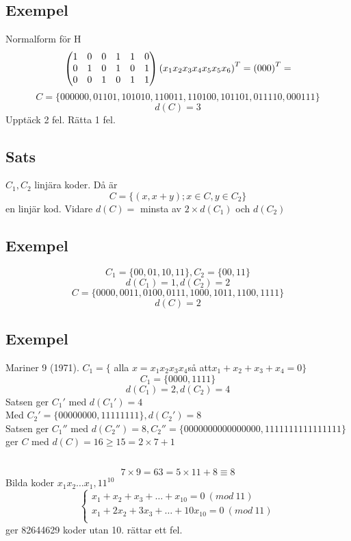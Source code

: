 \documentclass{article}
\begin{document}
\subsection{Exempel}
Normalform för H
$$
\left(\begin{matrix}
1&0&0& 1&1&0\\
0&1&0 &1&0&1\\
0&0&1 &0&1&1
\end{matrix}\right)
\left(
x_1 x_2 x_3 x_4 x_5 x_5 x_6
\right)^T =
\left(
0 0 0
\right)^T =
$$
$$ C=\{ 000000, 01101, 101010, 110011, 110100, 101101, 011110, 000111 \} $$
$$ d(C)=3 $$
Upptäck 2 fel.
Rätta 1 fel.

\subsection{Sats}
$C_1, C_2$ linjära koder.
Då är
$$ C=\{(x,x+y);x\in C, y\in C_2 \} $$
en linjär kod. Vidare $d(C)=$ minsta av $2\times d(C_1)$ och $d(C_2)$

\subsection{Exempel}
$$ C_1 = \{00,01,10,11\}, C_2=\{00,11\} $$
$$ d(C_1) = 1, d(C_2)=2 $$
$$ C =\{0000, 0011, 0100, 0111, 1000, 1011, 1100, 1111\} $$
$$ d(C) = 2$$

\subsection{Exempel}
Mariner 9 (1971).
$ C_1 =\{ $ alla $ x=x_1x_2x_3x_4 $så att$ x_1+x_2+x_3+x_4=0 \} $
$$ C_1 =\{ 0000, 1111 \} $$
$$ d(C_1) =2, d(C_2)=4$$
Satsen ger $C_1'$ med $d(C_1')=4$\\
Med $C_2' = \{00000000, 11111111\}, d(C_2')=8$\\
Satsen ger $C_1''$ med $d(C_2'')=8, C_2''=\{0000000000000000,1111111111111111\}$ ger $C$ med $d(C)=16\ge 15=2\times 7+1$

\subsection{}
$$ 7\times 9 = 63 = 5\times 11+8 \equiv 8 $$
Bilda koder $x_1 x_2\dots x_1, 11^{10}$
$$
\begin{cases}
  x_1+x_2+x_3+\dots+x_{10}=0\ (mod\ 11)\\
  x_1+2x_2+3x_3+\dots+10x_{10}=0\ (mod\ 11)\\
\end{cases}
$$
ger 82644629 koder utan 10.
rättar ett fel.
\end{document}
